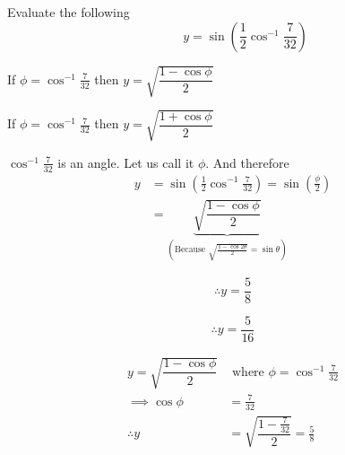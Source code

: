 \documentclass[14pt,fleqn]{extarticle}
\newcommand\val{\frac{7}{32}}
\newcommand\angb{\cos^{-1}\val}
\begin{document}
 
\begin{problem}
	\statement 
    
    Evaluate the following 
    \[\qquad y = \sin \left(\frac{1}{2}\cos^{-1}\val \right)\]
    
    \begin{step}
  \begin{options} 
     \correct 
       
       If $\phi = \cos^{-1} \val$ then $y = \sqrt{\dfrac{1-\cos\phi}{2}}$
     
     \incorrect
     
     If $\phi = \cos^{-1} \val$ then $y = \sqrt{\dfrac{1+\cos\phi}{2}}$
    \end{options} 
     \reason 
     
     $\cos^{-1}\val$ is an angle. Let us call it $\phi$. And therefore
    \begin{align}
	y &= \sin \left(\frac{1}{2}\angb \right) = \sin \left(\frac{\phi}{2} \right) \\
	&= \underbrace{\sqrt{\dfrac{1-\cos\phi}{2}}}_{\left(\text{Because } \sqrt{\frac{1-\cos 2\theta}{2}} = \sin\theta \right)}
\end{align}
       
\end{step}

\begin{step}
  \begin{options} 
     \correct 
       
       \[\therefore y = \frac{5}{8} \]
        
    \incorrect 
    
    \[\therefore y = \frac{5}{16} \]
    \end{options} 
     \reason 
     
     \begin{align}
     y = \sqrt{\dfrac{1-\cos \phi}{2}}&\text{ where } \phi=\angb \\
     \implies \cos\phi &= \val \\
     \therefore y &= \sqrt{\dfrac{1-\val}{2}} = \frac{5}{8}
\end{align}
       
\end{step}
\end{problem} 
\end{document}
